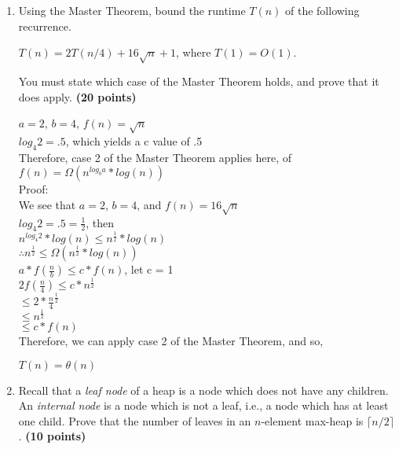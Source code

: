 \documentclass[11pt]{amsart}
\begin{document}
\begin{enumerate}
\item Using the Master Theorem, bound the runtime $T(n)$ of the following recurrence. 
\begin{center}
$T(n) = 2T(n/4) + 16\sqrt{n} + 1$, where $T(1) = O(1)$.
\end{center}
You must state which case of the Master Theorem holds, and prove that it does apply. \textbf{(20 points)} \\
\begin{doublespace}
	$a = 2$, $b = 4$, $f(n) = \sqrt{n}$\\
	$log_4{2} = .5$, which yields a c value of .5\\
	Therefore, case 2 of the Master Theorem applies here, of $f(n) = \Omega(n^{log_b{a}} * log(n))$\\
	Proof:\\
	We see that $a = 2$, $b = 4$, and $f(n)=16\sqrt{n}$\\
	$log_4{2} = .5 = \frac{1}{2}$, then\\
	$n^{log_4{2}} * log(n) \leq n^{\frac{1}{2}} * log(n)$\\
	$\therefore n^{\frac{1}{2}} \leq\Omega(n^{\frac{1}{2}} * log(n))$\\
	$a * f(\frac{n}{b}) \leq c * f(n)$, let c = 1\\
	$2f(\frac{n}{4})\leq c * n^{\frac{1}{2}}$\\
	$\leq 2 * \frac{n}{4}^\frac{1}{2}$\\
	$\leq n^\frac{1}{2}$\\
	$\leq c * f(n)$\\
	Therefore, we can apply case 2 of the Master Theorem, and so,\\
	\begin{center}
		$T(n) = \theta(n)$
	\end{center}
\end{doublespace}

\newpage

\item Recall that a \textit{leaf node} of a heap is a node which does not have any children. An \textit{internal node} is a node which is not a leaf, i.e., a node which has at least one child. Prove that the number of leaves in an $n$-element max-heap is $\lceil n / 2 \rceil$. \textbf{(10 points)}

\smallskip


\end{enumerate}
\end{document}
